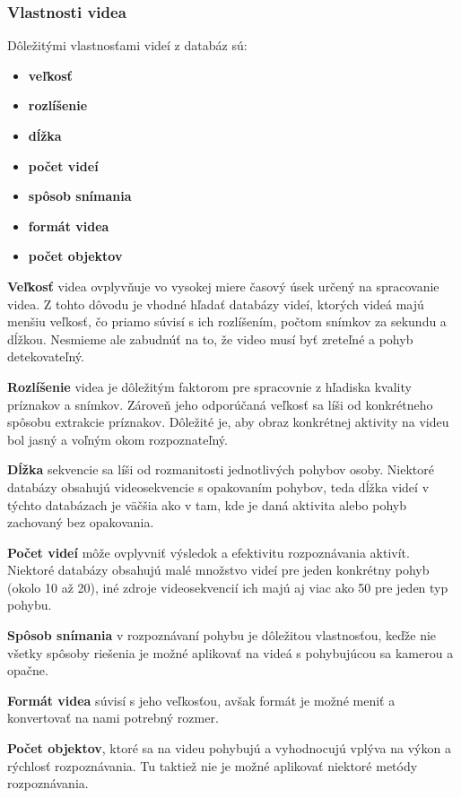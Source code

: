 \subsubsection{Vlastnosti videa} Dôležitými vlastnosťami videí z databáz sú:
\begin{itemize}
\item \textbf{veľkosť}
\item \textbf{rozlíšenie}
\item \textbf{dĺžka}
\item \textbf{počet videí}
\item \textbf{spôsob snímania}
\item \textbf{formát videa}
\item \textbf{počet objektov}
\end{itemize}

\textbf{Veľkosť} videa ovplyvňuje vo vysokej miere časový úsek určený na spracovanie videa. Z tohto dôvodu je vhodné hľadať databázy videí, ktorých videá majú menšiu veľkosť, čo priamo súvisí s ich rozlíšením, počtom snímkov za sekundu a dĺžkou. Nesmieme ale zabudnúť na to, že video musí byť zreteľné a pohyb detekovateľný.

\textbf{Rozlíšenie} videa je dôležitým faktorom pre spracovnie z hľadiska kvality príznakov a snímkov. Zároveň jeho odporúčaná veľkosť sa líši od konkrétneho spôsobu extrakcie príznakov. Dôležité je, aby obraz konkrétnej aktivity na videu bol jasný a voľným okom rozpoznateľný.

\textbf{Dĺžka} sekvencie sa líši od rozmanitosti jednotlivých pohybov osoby. Niektoré databázy obsahujú videosekvencie s opakovaním pohybov, teda dĺžka videí v týchto databázach je väčšia ako v tam, kde je daná aktivita alebo pohyb zachovaný bez opakovania.

\textbf{Počet videí} môže ovplyvniť výsledok a efektivitu rozpoznávania aktivít. Niektoré databázy obsahujú malé množstvo videí pre jeden konkrétny pohyb (okolo 10 až 20), iné zdroje videosekvencií ich majú aj viac ako 50 pre jeden typ pohybu.

\textbf{Spôsob snímania} v rozpoznávaní pohybu je dôležitou vlastnosťou, keďže nie všetky spôsoby riešenia je možné aplikovať na videá s pohybujúcou sa kamerou a opačne. 

\textbf{Formát videa} súvisí s jeho veľkosťou, avšak formát je možné meniť a konvertovať na nami potrebný rozmer.

\textbf{Počet objektov}, ktoré sa na videu pohybujú a vyhodnocujú vplýva na výkon a rýchlosť rozpoznávania. Tu taktiež nie je možné aplikovať niektoré metódy rozpoznávania.

